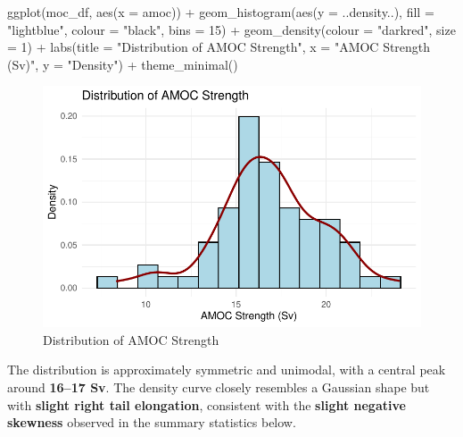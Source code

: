 \documentclass[
  11pt,
]{article}
\newenvironment{Shaded}{\begin{snugshade}}{\end{snugshade}}
\newcommand{\AttributeTok}[1]{\textcolor[rgb]{0.40,0.45,0.13}{#1}}
\newcommand{\DecValTok}[1]{\textcolor[rgb]{0.68,0.00,0.00}{#1}}
\newcommand{\FunctionTok}[1]{\textcolor[rgb]{0.28,0.35,0.67}{#1}}
\newcommand{\NormalTok}[1]{\textcolor[rgb]{0.00,0.23,0.31}{#1}}
\newcommand{\SpecialCharTok}[1]{\textcolor[rgb]{0.37,0.37,0.37}{#1}}
\newcommand{\StringTok}[1]{\textcolor[rgb]{0.13,0.47,0.30}{#1}}
\begin{document}
\begin{Shaded}
\begin{Highlighting}[]
\FunctionTok{ggplot}\NormalTok{(moc\_df, }\FunctionTok{aes}\NormalTok{(}\AttributeTok{x =}\NormalTok{ amoc)) }\SpecialCharTok{+}
  \FunctionTok{geom\_histogram}\NormalTok{(}\FunctionTok{aes}\NormalTok{(}\AttributeTok{y =}\NormalTok{ ..density..), }\AttributeTok{fill =} \StringTok{"lightblue"}\NormalTok{, }\AttributeTok{colour =} \StringTok{"black"}\NormalTok{, }\AttributeTok{bins =} \DecValTok{15}\NormalTok{) }\SpecialCharTok{+}
  \FunctionTok{geom\_density}\NormalTok{(}\AttributeTok{colour =} \StringTok{"darkred"}\NormalTok{, }\AttributeTok{size =} \DecValTok{1}\NormalTok{) }\SpecialCharTok{+}
  \FunctionTok{labs}\NormalTok{(}\AttributeTok{title =} \StringTok{"Distribution of AMOC Strength"}\NormalTok{,}
       \AttributeTok{x =} \StringTok{"AMOC Strength (Sv)"}\NormalTok{, }\AttributeTok{y =} \StringTok{"Density"}\NormalTok{) }\SpecialCharTok{+}
  \FunctionTok{theme\_minimal}\NormalTok{()}
\end{Highlighting}
\end{Shaded}

\begin{figure}[H]

{\centering \includegraphics{project_files/figure-pdf/fig-AMOC Histo-1.pdf}

}

\caption{Distribution of AMOC Strength}

\end{figure}%

The distribution is approximately symmetric and unimodal, with a central
peak around \textbf{16--17 Sv}. The density curve closely resembles a
Gaussian shape but with \textbf{slight right tail elongation},
consistent with the \textbf{slight negative skewness} observed in the
summary statistics below.
\end{document}
